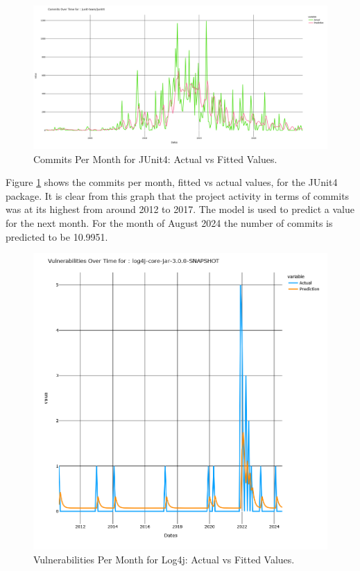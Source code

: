 \documentclass[conference]{IEEEtran}
\begin{document}
\begin{figure}
    \centering
    \includegraphics[width=1\linewidth]{JUnit4commits.png}
    \caption{Commits Per Month for JUnit4: Actual vs Fitted Values.} 
    \label{fig:commits}
\end{figure}

Figure \ref{fig:commits} shows the commits per month, fitted vs actual values, for the JUnit4 package. It is clear from this graph that the project activity in terms of commits was at its highest from around 2012 to 2017. The model is used to predict a value for the next month. For the month of August 2024 the number of commits is predicted to be 10.9951. 

\begin{figure}
    \centering
    \includegraphics[width=1\linewidth]{Log4jVuls.png}
    \caption{Vulnerabilities Per Month for Log4j: Actual vs Fitted Values.} 
    \label{fig:vulns}
\end{figure}
\end{document}
